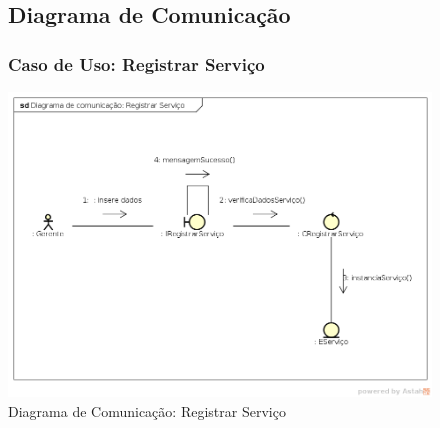 \documentclass[
	12pt,				%
	openright,
	oneside,			%
	a4paper,			%
	chapter=TITLE,		%
	brazil				%
	]{abntex2}
\begin{document}
\begin{figure}[h!]

\subsection{Diagrama de Comunicação}

\subsubsection*{Caso de Uso: Registrar Serviço}


	\caption{Diagrama de Comunicação: Registrar Serviço}
	\begin{center}
	    \includegraphics[scale=0.5]{Arquivos/Projeto/C_registrar_servico}  
	\end{center}
\end{figure}
\end{document}
